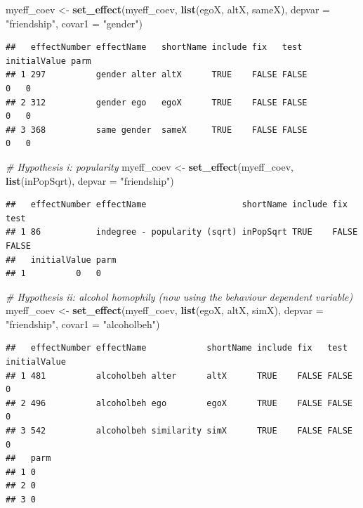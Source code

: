 \documentclass[
]{article}
\newenvironment{Shaded}{\begin{snugshade}}{\end{snugshade}}
\newcommand{\AttributeTok}[1]{\textcolor[rgb]{0.13,0.29,0.53}{#1}}
\newcommand{\CommentTok}[1]{\textcolor[rgb]{0.56,0.35,0.01}{\textit{#1}}}
\newcommand{\FunctionTok}[1]{\textcolor[rgb]{0.13,0.29,0.53}{\textbf{#1}}}
\newcommand{\NormalTok}[1]{#1}
\newcommand{\OtherTok}[1]{\textcolor[rgb]{0.56,0.35,0.01}{#1}}
\newcommand{\StringTok}[1]{\textcolor[rgb]{0.31,0.60,0.02}{#1}}
\begin{document}
\begin{Shaded}
\begin{Highlighting}[]
\NormalTok{myeff\_coev }\OtherTok{\textless{}{-}} \FunctionTok{set\_effect}\NormalTok{(myeff\_coev, }\FunctionTok{list}\NormalTok{(egoX, altX, sameX), }\AttributeTok{depvar =} \StringTok{"friendship"}\NormalTok{,}
                         \AttributeTok{covar1 =} \StringTok{"gender"}\NormalTok{)}
\end{Highlighting}
\end{Shaded}

\begin{verbatim}
##   effectNumber effectName   shortName include fix   test  initialValue parm
## 1 297          gender alter altX      TRUE    FALSE FALSE          0   0   
## 2 312          gender ego   egoX      TRUE    FALSE FALSE          0   0   
## 3 368          same gender  sameX     TRUE    FALSE FALSE          0   0
\end{verbatim}

\begin{Shaded}
\begin{Highlighting}[]
\CommentTok{\# Hypothesis i: popularity}
\NormalTok{myeff\_coev }\OtherTok{\textless{}{-}} \FunctionTok{set\_effect}\NormalTok{(myeff\_coev, }\FunctionTok{list}\NormalTok{(inPopSqrt),   }\AttributeTok{depvar =} \StringTok{"friendship"}\NormalTok{)}
\end{Highlighting}
\end{Shaded}

\begin{verbatim}
##   effectNumber effectName                   shortName include fix   test 
## 1 86           indegree - popularity (sqrt) inPopSqrt TRUE    FALSE FALSE
##   initialValue parm
## 1          0   0
\end{verbatim}

\begin{Shaded}
\begin{Highlighting}[]
\CommentTok{\# Hypothesis ii: alcohol homophily (now using the behaviour dependent variable)}
\NormalTok{myeff\_coev }\OtherTok{\textless{}{-}} \FunctionTok{set\_effect}\NormalTok{(myeff\_coev, }\FunctionTok{list}\NormalTok{(egoX, altX, simX), }\AttributeTok{depvar =} \StringTok{"friendship"}\NormalTok{,}
                         \AttributeTok{covar1 =} \StringTok{"alcoholbeh"}\NormalTok{)}
\end{Highlighting}
\end{Shaded}

\begin{verbatim}
##   effectNumber effectName            shortName include fix   test  initialValue
## 1 481          alcoholbeh alter      altX      TRUE    FALSE FALSE          0  
## 2 496          alcoholbeh ego        egoX      TRUE    FALSE FALSE          0  
## 3 542          alcoholbeh similarity simX      TRUE    FALSE FALSE          0  
##   parm
## 1 0   
## 2 0   
## 3 0
\end{verbatim}
\end{document}

